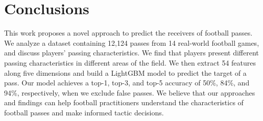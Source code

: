 \section{Conclusions} \label{conclusions}

This work proposes a novel approach to predict the receivers of football passes.
We analyze a dataset containing 12,124 passes from 14 real-world football games, and discuss players' passing characteristics. We find that players present different passing characteristics in different areas of the field.
We then extract 54 features along five dimensions and build a LightGBM model to predict the target of a pass. 
Our model achieves a top-1, top-3, and top-5 accuracy of 50\%, 84\%, and 94\%, respectively, when we exclude false passes.
We believe that our approaches and findings can help football practitioners understand the characteristics of football passes and make informed tactic decisions.